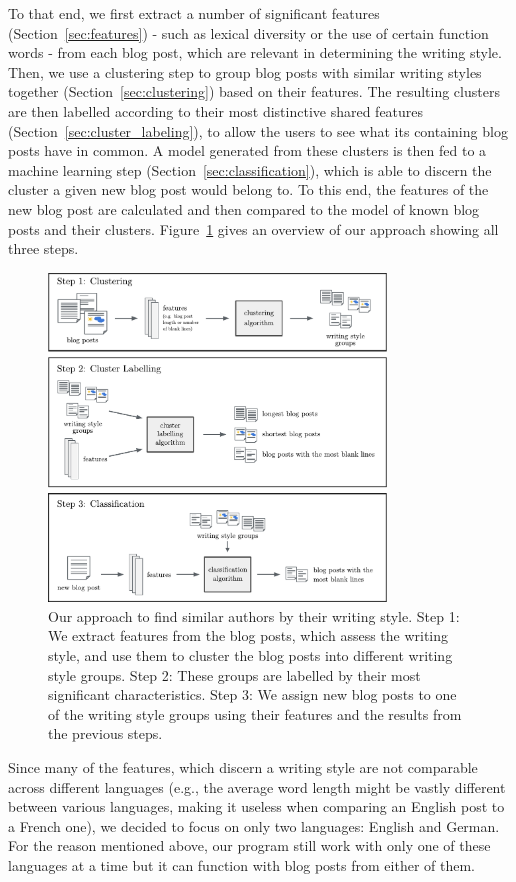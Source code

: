 To that end, we first extract a number of significant features (Section~\ref{sec:features}) - such as lexical diversity or the use of certain function words - from each blog post, which are relevant in determining the writing style.
Then, we use a clustering step to group blog posts with similar writing styles together (Section~\ref{sec:clustering}) based on their features.
The resulting clusters are then labelled according to their most distinctive shared features (Section~\ref{sec:cluster_labeling}), to allow the users to see what its containing blog posts have in common.
A model generated from these clusters is then fed to a machine learning step (Section~\ref{sec:classification}), which is able to discern the cluster a given new blog post would belong to.
To this end, the features of the new blog post are calculated and then compared to the model of known blog posts and their clusters.
Figure~\ref{fig:figure_1} gives an overview of our approach showing all three steps.

\begin{figure}[ht!]
    \centering
    \includegraphics[width=0.8\textwidth]{images/Figure_1.pdf}
    \caption{Our approach to find similar authors by their writing style. Step 1: We extract features from the blog posts, which assess the writing style, and use them to cluster the blog posts into different writing style groups. Step 2: These groups are labelled by their most significant characteristics. Step 3: We assign new blog posts to one of the writing style groups using their features and the results from the previous steps.}
    \label{fig:figure_1}
\end{figure}

Since many of the features, which discern a writing style are not comparable across different languages (e.g., the average word length might be vastly different between various languages, making it useless when comparing an English post to a French one), we decided to focus on only two languages: English and German.
For the reason mentioned above, our program still work with only one of these languages at a time but it can function with blog posts from either of them.

